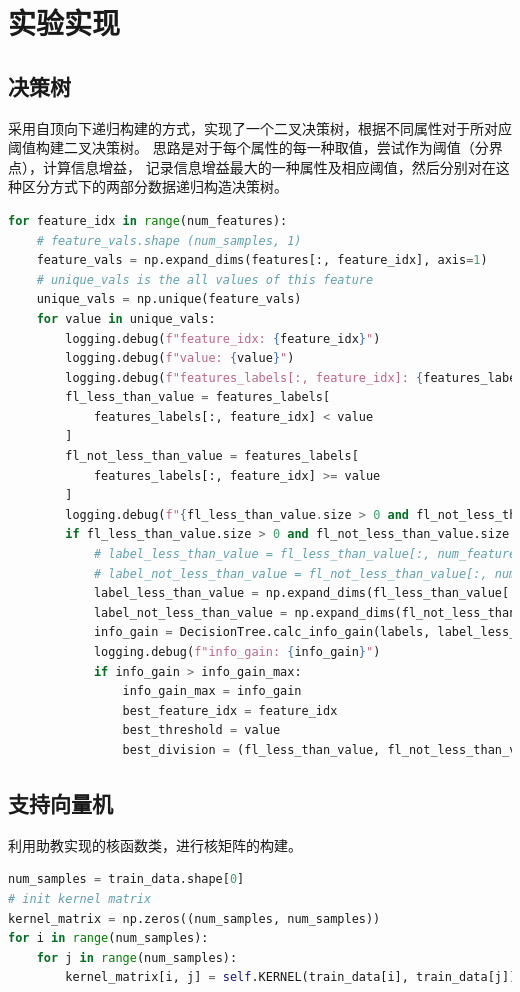 \documentclass[UTF8]{article}
\begin{document}
    \section{实验实现}
    \subsection{决策树}
    采用自顶向下递归构建的方式，实现了一个二叉决策树，根据不同属性对于所对应阈值构建二叉决策树。
    思路是对于每个属性的每一种取值，尝试作为阈值（分界点），计算信息增益，
    记录信息增益最大的一种属性及相应阈值，然后分别对在这种区分方式下的两部分数据递归构造决策树。
    \begin{lstlisting}[language=python]
for feature_idx in range(num_features):
    # feature_vals.shape (num_samples, 1)
    feature_vals = np.expand_dims(features[:, feature_idx], axis=1)
    # unique_vals is the all values of this feature
    unique_vals = np.unique(feature_vals)
    for value in unique_vals:
        logging.debug(f"feature_idx: {feature_idx}")
        logging.debug(f"value: {value}")
        logging.debug(f"features_labels[:, feature_idx]: {features_labels[:, feature_idx]}")
        fl_less_than_value = features_labels[
            features_labels[:, feature_idx] < value
        ]
        fl_not_less_than_value = features_labels[
            features_labels[:, feature_idx] >= value
        ]
        logging.debug(f"{fl_less_than_value.size > 0 and fl_not_less_than_value.size > 0}")
        if fl_less_than_value.size > 0 and fl_not_less_than_value.size > 0:
            # label_less_than_value = fl_less_than_value[:, num_features:]
            # label_not_less_than_value = fl_not_less_than_value[:, num_features:]
            label_less_than_value = np.expand_dims(fl_less_than_value[:, -1], axis=1)
            label_not_less_than_value = np.expand_dims(fl_not_less_than_value[:, -1], axis=1)
            info_gain = DecisionTree.calc_info_gain(labels, label_less_than_value, label_not_less_than_value)
            logging.debug(f"info_gain: {info_gain}")
            if info_gain > info_gain_max:
                info_gain_max = info_gain
                best_feature_idx = feature_idx
                best_threshold = value
                best_division = (fl_less_than_value, fl_not_less_than_value)
    \end{lstlisting}
    \subsection{支持向量机}
    利用助教实现的核函数类，进行核矩阵的构建。
    \begin{lstlisting}[language=python]
num_samples = train_data.shape[0]
# init kernel matrix
kernel_matrix = np.zeros((num_samples, num_samples))
for i in range(num_samples):
    for j in range(num_samples):
        kernel_matrix[i, j] = self.KERNEL(train_data[i], train_data[j])
    \end{lstlisting}
\end{document}
